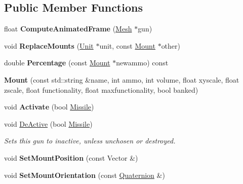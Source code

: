 \subsection*{Public Member Functions}
\begin{DoxyCompactItemize}
\item 
float {\bfseries Compute\+Animated\+Frame} (\hyperlink{classMesh}{Mesh} $\ast$gun)\hypertarget{classMount_a1af741f61d1950aa0af0ff8043efc24a}{}\label{classMount_a1af741f61d1950aa0af0ff8043efc24a}

\item 
void {\bfseries Replace\+Mounts} (\hyperlink{classUnit}{Unit} $\ast$unit, const \hyperlink{classMount}{Mount} $\ast$other)\hypertarget{classMount_ac6f68287b8ac4fe18fe3bed62fa0e542}{}\label{classMount_ac6f68287b8ac4fe18fe3bed62fa0e542}

\item 
double {\bfseries Percentage} (const \hyperlink{classMount}{Mount} $\ast$newammo) const \hypertarget{classMount_a95ef31e557563aa4b01a899402563315}{}\label{classMount_a95ef31e557563aa4b01a899402563315}

\item 
{\bfseries Mount} (const std\+::string \&name, int ammo, int volume, float xyscale, float zscale, float functionality, float maxfunctionality, bool banked)\hypertarget{classMount_a139c8f8bdc34d4a96045fc04e786261e}{}\label{classMount_a139c8f8bdc34d4a96045fc04e786261e}

\item 
void {\bfseries Activate} (bool \hyperlink{classMissile}{Missile})\hypertarget{classMount_afaa408264dbcefad50d3ba9c658e5215}{}\label{classMount_afaa408264dbcefad50d3ba9c658e5215}

\item 
void \hyperlink{classMount_ac0ea3cddae54a2528e451a0e2ff9d2a7}{De\+Active} (bool \hyperlink{classMissile}{Missile})\hypertarget{classMount_ac0ea3cddae54a2528e451a0e2ff9d2a7}{}\label{classMount_ac0ea3cddae54a2528e451a0e2ff9d2a7}

\begin{DoxyCompactList}\small\item\em Sets this gun to inactive, unless unchosen or destroyed. \end{DoxyCompactList}\item 
void {\bfseries Set\+Mount\+Position} (const Vector \&)\hypertarget{classMount_a261a6a850a7fbdb3c430e05b2b421700}{}\label{classMount_a261a6a850a7fbdb3c430e05b2b421700}

\item 
void {\bfseries Set\+Mount\+Orientation} (const \hyperlink{structQuaternion}{Quaternion} \&)\hypertarget{classMount_ab388ca6e5d707831f7949a8417e099bc}{}\label{classMount_ab388ca6e5d707831f7949a8417e099bc}


\end{DoxyCompactItemize}
